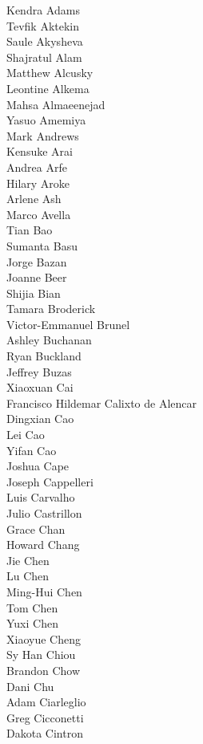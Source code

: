 Kendra Adams\\
Tevfik Aktekin\\
Saule Akysheva\\
Shajratul Alam\\
Matthew Alcusky\\
Leontine Alkema\\
Mahsa Almaeenejad\\
Yasuo Amemiya\\
Mark Andrews\\
Kensuke Arai\\
Andrea Arfe\\
Hilary Aroke\\
Arlene Ash\\
Marco Avella\\
Tian Bao\\
Sumanta Basu\\
Jorge Bazan\\
Joanne Beer\\
Shijia Bian\\
Tamara Broderick\\
Victor-Emmanuel Brunel\\
Ashley Buchanan\\
Ryan Buckland\\
Jeffrey Buzas\\
Xiaoxuan Cai\\
Francisco Hildemar Calixto de Alencar\\
Dingxian Cao\\
Lei Cao\\
Yifan Cao\\
Joshua Cape\\
Joseph Cappelleri\\
Luis Carvalho\\
Julio Castrillon\\
Grace Chan\\
Howard Chang\\
Jie Chen\\
Lu Chen\\
Ming-Hui Chen\\
Tom Chen\\
Yuxi Chen\\
Xiaoyue Cheng\\
Sy Han Chiou\\
Brandon Chow\\
Dani Chu\\
Adam Ciarleglio\\
Greg Cicconetti\\
Dakota Cintron\\
